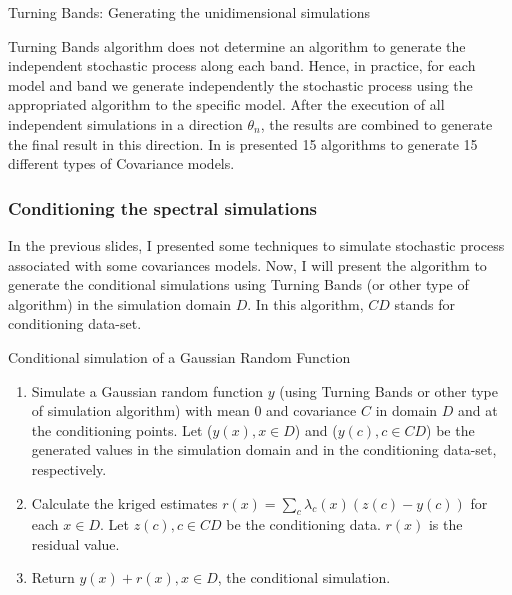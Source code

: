 \begin{frame}{Turning Bands: Generating the unidimensional simulations}
 
 Turning Bands algorithm does not determine an algorithm to generate the independent stochastic process along each band. 
 Hence, in practice, for each model and band we generate independently the stochastic process using the appropriated 
 algorithm to the specific model. After the execution of all independent simulations in a direction $\theta_n$, 
 the results are combined to generate the final result in this direction. In \cite{emery2006tbsim} is presented 15 algorithms to generate 15 different types of Covariance models.
 
\end{frame}

\begin{frame}
\frametitle{Conditioning the spectral simulations}
 In the previous slides, I presented some techniques to simulate stochastic process associated with some covariances models. Now,
 I will present the algorithm to generate the conditional simulations using Turning Bands (or other type of algorithm)
 in the simulation domain $D$. 
 In this algorithm, $CD$ stands for conditioning data-set.
 
\begin{block}{Conditional simulation of a Gaussian Random Function}
 \begin{enumerate}
  \item Simulate a Gaussian random function $y$ (using Turning Bands or other type of simulation algorithm) with mean $0$ and covariance $C$
  in  domain $D$ and at the conditioning points. Let ($y(x), x \in D$) and ($y(c), c \in CD$) be the generated values in the simulation domain and in the conditioning data-set, respectively.
  \item Calculate the kriged estimates $r(x) = \sum_c\lambda_c(x)(z(c) - y(c))$ for each $x \in D$. Let $z(c), c \in CD$ be the conditioning data. $r(x)$ is the residual value.
  \item Return $y(x) + r(x), x \in D$, the conditional simulation.
 \end{enumerate}

\end{block}

\end{frame}


